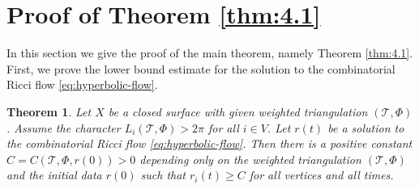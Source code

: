 \documentclass[12pt]{amsart}
\numberwithin{equation}{section}
\newtheorem{theo}[prop]{Theorem}
\begin{document}
\section{Proof of Theorem \ref{thm:4.1}}\label{sec:proof}

In this section we give the proof of the main theorem, namely Theorem \ref{thm:4.1}. First, we prove the lower
bound estimate for the solution to the combinatorial Ricci flow \eqref{eq:hyperbolic-flow}.

\begin{theo}\label{thm:7.1}
Let $X$ be a closed surface with given weighted triangulation $(\mathcal{T},\Phi)$. Assume the
character $L_i(\mathcal{T},\Phi) > 2\pi$ for all $i \in V$. Let $r(t)$ be a solution to the combinatorial Ricci flow \eqref{eq:hyperbolic-flow}.
Then there is a positive constant $C = C(\mathcal{T}, \Phi, r(0)) > 0$ depending only on the weighted triangulation
$(\mathcal{T},\Phi)$ and the initial data $r(0)$ such that $r_i(t) \geq C$ for all vertices and all times.
\end{theo}
\end{document}
